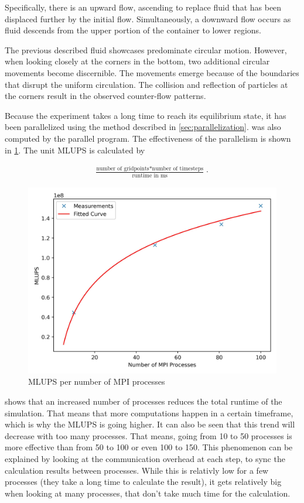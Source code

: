 Specifically, there is an upward flow, ascending to replace fluid that has been displaced further by the initial flow.
Simultaneously, a downward flow occurs as fluid descends from the upper portion of the container to lower regions.
\newline

The previous described fluid showcases predominate circular motion.
However, when looking closely at the corners in the bottom, two additional circular movements become discernible.
The movements emerge because of the boundaries that disrupt the uniform circulation.
The collision and reflection of particles at the corners result in the observed counter-flow patterns.
\newline

Because the experiment takes a long time to reach its equilibrium state, it has been parallelized using the method described in \cref{sec:parallelization}.
 was also computed by the parallel program.
The effectiveness of the parallelism is shown in \cref{fig:sl-mlups}.
The unit MLUPS is calculated by

\begin{equation*}
    \begin{aligned}
        \frac{\text{number of gridpoints} * \text{number of timesteps}}{\text{runtime in ms}} \cdot
    \end{aligned}
\end{equation*}

\begin{figure}[H]
    \begin{center}
        \includegraphics[width=0.5\linewidth]{graphs/SlidingLit/mlups}
        \caption{MLUPS per number of MPI processes}
        \label{fig:sl-mlups}
    \end{center}
\end{figure}

 shows that an increased number of processes reduces the total runtime of the simulation.
That means that more computations happen in a certain timeframe, which is why the MLUPS is going higher.
It can also be seen that this trend will decrease with too many processes.
That means, going from 10 to 50 processes is more effective than from 50 to 100 or even 100 to 150.
This phenomenon can be explained by looking at the communication overhead at each step, to sync the calculation results between processes.
While this is relativly low for a few processes (they take a long time to calculate the result), it gets relatively big when looking at many processes, that don't take much time for the calculation.
\newline

